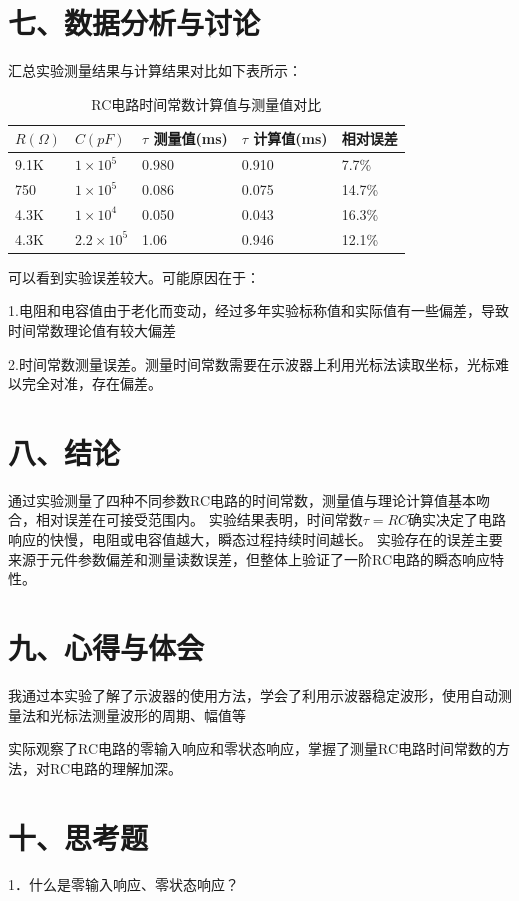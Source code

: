 \documentclass[12pt,a4paper]{article}
\renewcommand{\normalsize}{\fontsize{12pt}{18pt}\selectfont}
\begin{document}
\section*{七、数据分析与讨论}
汇总实验测量结果与计算结果对比如下表所示：
\begin{table}[H]
\footnotesize
\caption{\normalsize  RC电路时间常数计算值与测量值对比} 
\centering  
\renewcommand{\arraystretch}{1.1}
\begin{tabular}{*{5}{l}} 
\hline\hline   
$R(\Omega)$ &$C(pF)$ &$\tau$ 测量值(ms) &$\tau$ 计算值(ms)&相对误差 \\ 
\hline
9.1K & $1 \times 10^{5}$& 0.980& 0.910&7.7\%\\
750 & $1 \times 10^{5}$& 0.086& 0.075&14.7\%\\
4.3K & $1 \times 10^4$& 0.050& 0.043&16.3\%\\
4.3K & $2.2 \times 10^5$& 1.06& 0.946&12.1\%\\
\hline  
    \end{tabular}
    \label{table:7.1}
\end{table}
可以看到实验误差较大。可能原因在于：

1.电阻和电容值由于老化而变动，经过多年实验标称值和实际值有一些偏差，导致时间常数理论值有较大偏差

2.时间常数测量误差。测量时间常数需要在示波器上利用光标法读取坐标，光标难以完全对准，存在偏差。
\section*{八、结论}

通过实验测量了四种不同参数RC电路的时间常数，测量值与理论计算值基本吻合，相对误差在可接受范围内。
实验结果表明，时间常数$\tau=RC$确实决定了电路响应的快慢，电阻或电容值越大，瞬态过程持续时间越长。
实验存在的误差主要来源于元件参数偏差和测量读数误差，但整体上验证了一阶RC电路的瞬态响应特性。
\section*{九、心得与体会}
我通过本实验了解了示波器的使用方法，学会了利用示波器稳定波形，使用自动测量法和光标法测量波形的周期、幅值等

实际观察了RC电路的零输入响应和零状态响应，掌握了测量RC电路时间常数的方法，对RC电路的理解加深。
\section*{十、思考题}
1．什么是零输入响应、零状态响应？ 
\end{document}
